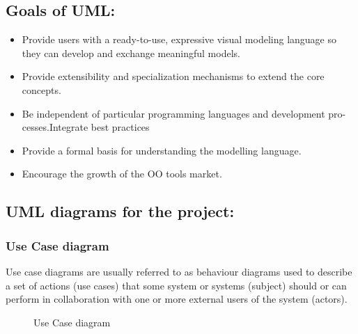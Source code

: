 \documentclass[12pt,a4paper]{report}
\begin{document}
\subsection{Goals of UML:}

\begin{itemize}
\item Provide users with a ready-to-use, expressive visual modeling language so they
can develop and exchange meaningful models.
\item Provide extensibility and specialization mechanisms to extend the core concepts.
\item Be independent of particular programming languages and development pro-
cesses.Integrate best practices
\item Provide a formal basis for understanding the modelling language.
\item Encourage the growth of the OO tools market.
\end{itemize}

\newpage
\subsection{UML diagrams for the project:}
\subsubsection{Use Case diagram}
Use case diagrams are usually referred to as behaviour diagrams used to describe a set of actions (use cases) that some system or systems (subject) should or can perform in collaboration with one or more external users of the system (actors).

	\begin{figure}[h]
		\begin{center}
			\caption{Use Case diagram}
		\end{center}
	\end{figure}
\end{document}
